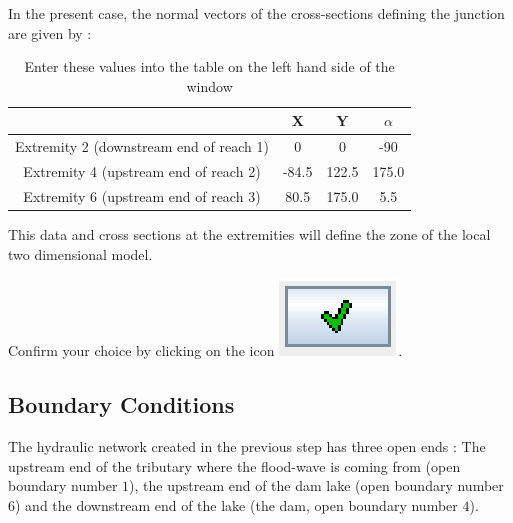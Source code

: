 \documentclass[a4paper,12pt]{article}
\begin{document}
\vspace{0.5cm}

In the present case, the normal vectors of the cross-sections defining
the junction are given by : 

\begin{table}[h]

\begin{center}

\begin{tabular}{|c|c|c|c|}
\hline 
 & X & Y & $\alpha$ \tabularnewline
\hline 
\hline 
Extremity 2 (downstream end of reach 1) & 0 & 0 & -90\tabularnewline
\hline 
Extremity 4 (upstream end of reach 2) & -84.5 & 122.5 & 175.0\tabularnewline
\hline 
Extremity 6 (upstream end of reach 3) & 80.5 & 175.0 & 5.5\tabularnewline
\hline 
\end{tabular}

\caption{Enter these values into the table on the left hand side of the window}

\end{center}

\end{table}

This data and  cross sections at the extremities will define the zone of the local two dimensional model.

\vspace{0.5cm}

Confirm your choice by clicking on the icon \includegraphics[scale=0.6]{valid}.


\subsection{Boundary Conditions  
 
 }

\hspace{0.5cm} The hydraulic network created in the previous step has three open
ends : The upstream end of the tributary where the flood-wave is coming
from (open boundary number $1$), the upstream end of the dam lake (open
boundary number $6$) and the downstream end of the lake (the dam, open
boundary number $4$).
\end{document}
